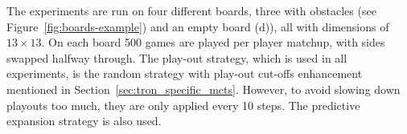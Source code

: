 \documentclass{article}
\begin{document}
The experiments are run on four different boards, three with obstacles (see Figure~\ref{fig:boards-example}) and an empty board (d)), all with dimensions of $13 \times 13$. On each board 500 games are played per player matchup, with sides swapped halfway through.
The play-out strategy, which is used in all experiments, is the random strategy with play-out cut-offs enhancement mentioned in Section~\ref{sec:tron_specific_mcts}. 
However, to avoid slowing down playouts too much, they are only applied every 10 steps. 
The predictive expansion strategy is also used.

\end{document}
